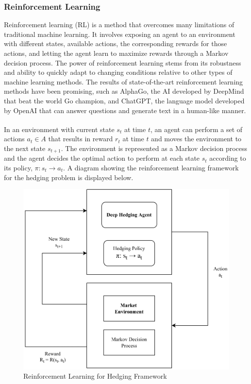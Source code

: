 \subsubsection{Reinforcement Learning}
Reinforcement learning (RL) is a method that overcomes many limitations of traditional machine learning. It involves exposing an agent to an environment with different states, available actions, the corresponding rewards for those actions, and letting the agent learn to maximize rewards through a Markov decision process. The power of reinforcement learning stems from its robustness and ability to quickly adapt to changing conditions relative to other types of machine learning methods. The results of state-of-the-art reinforcement learning methods have been promising, such as AlphaGo, the AI developed by DeepMind that beat the world Go champion, and ChatGPT, the language model developed by OpenAI that can answer questions and generate text in a human-like manner.
\\ \\
In an environment with current state $s_t$ at time $t$, an agent can perform a set of actions $a_t \in A$ that results in reward $r_t$ at time $t$ and moves the environment to the next state $s_{t+1}$. The environment is represented as a Markov decision process and the agent decides the optimal action to perform at each state $s_t$ according to its policy, $\pi: s_t \to a_t$. A diagram showing the reinforcement learning framework for the hedging problem is displayed below.
\\
\begin{figure}[h]
\centering
\includegraphics[width=11.5cm]{templates/assets/drl/rl.png}
\caption{Reinforcement Learning for Hedging Framework}
\end{figure}

